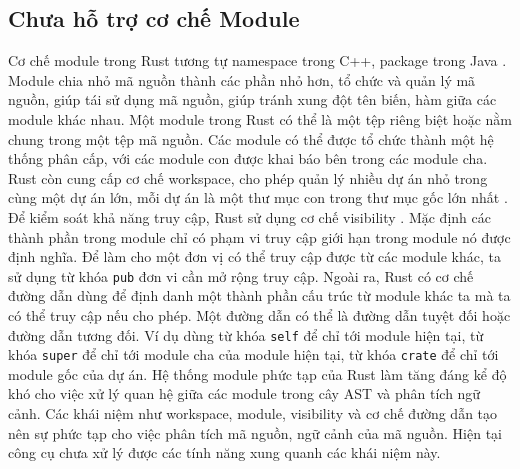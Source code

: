 \subsection{Chưa hỗ trợ cơ chế Module}

Cơ chế module trong Rust tương tự namespace trong C++, package trong Java \cite{rustlangManagingGrowing}.
Module chia nhỏ mã nguồn thành các phần nhỏ hơn, tổ chức và quản lý mã nguồn, giúp tái sử dụng mã nguồn, giúp tránh xung đột tên biến, hàm giữa các module khác nhau.
Một module trong Rust có thể là một tệp riêng biệt hoặc nằm chung trong một tệp mã nguồn.
Các module có thể được tổ chức thành một hệ thống phân cấp, với các module con được khai báo bên trong các module cha.
Rust còn cung cấp cơ chế workspace, cho phép quản lý nhiều dự án nhỏ trong cùng một dự án lớn, mỗi dự án là một thư mục con trong thư mục gốc lớn nhất \cite{rustlangCargoWorkspaces}.
Để kiểm soát khả năng truy cập, Rust sử dụng cơ chế visibility \cite{rustlangVisibilityPrivacy}.
Mặc định các thành phần trong module chỉ có phạm vi truy cập giới hạn trong module nó được định nghĩa.
Để làm cho một đơn vị có thể truy cập được từ các module khác, ta sử dụng từ khóa \texttt{pub} đơn vi cần mở rộng truy cập.
Ngoài ra, Rust có cơ chế đường dẫn dùng để định danh một thành phần cấu trúc từ module khác ta mà ta có thể truy cập nếu cho phép.
Một đường dẫn có thể là đường dẫn tuyệt đối hoặc đường dẫn tương đối.
Ví dụ dùng từ khóa \texttt{self} để chỉ tới module hiện tại, từ khóa \texttt{super} để chỉ tới module cha của module hiện tại, từ khóa \texttt{crate} để chỉ tới module gốc của dự án.
Hệ thống module phức tạp của Rust làm tăng đáng kể độ khó cho việc xử lý quan hệ giữa các module trong cây AST và phân tích ngữ cảnh.
Các khái niệm như workspace, module, visibility và cơ chế đường dẫn tạo nên sự phức tạp cho việc phân tích mã nguồn, ngữ cảnh của mã nguồn.
Hiện tại công cụ chưa xử lý được các tính năng xung quanh các khái niệm này.


